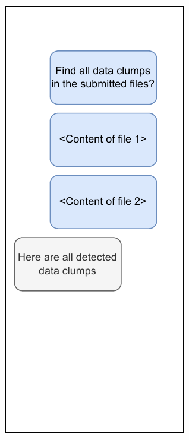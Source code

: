 \begin{figure}
  \begin{adjustbox}{minipage=\linewidth,scale=0.7}
     \centering
     \begin{subfigure}[b]{0.3\textwidth}
         \centering
         \includegraphics[width=\textwidth]{figures/chapter2/chatgpt_stateless_1.drawio.pdf}

\end{subfigure}
\end{adjustbox}
\end{figure}
